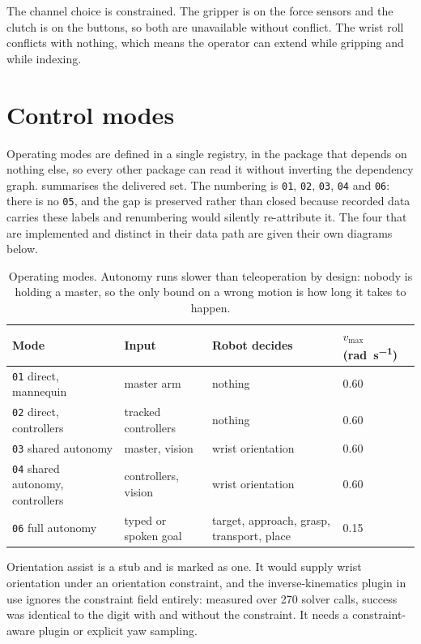 The channel choice is constrained. The gripper is on the force sensors and the
clutch is on the buttons, so both are unavailable without conflict. The wrist
roll conflicts with nothing, which means the operator can extend while
gripping and while indexing.

\section{Control modes}

Operating modes are defined in a single registry, in the package that depends
on nothing else, so every other package can read it without inverting the
dependency graph.  summarises the delivered set. The numbering
is \texttt{01}, \texttt{02}, \texttt{03}, \texttt{04} and \texttt{06}: there is
no \texttt{05}, and the gap is preserved rather than closed because recorded
data carries these labels and renumbering would silently re-attribute it. The
four that are implemented and distinct in their data path are given their own
diagrams below.

\begin{table}[htbp]
  \centering
  \caption{Operating modes. Autonomy runs slower than teleoperation by design:
  nobody is holding a master, so the only bound on a wrong motion is how long
  it takes to happen.}
  \label{tab:modes}
  \begin{tabular}{@{}llll@{}}
    \toprule
    Mode & Input & Robot decides & $v_{\max}$ (\si{\radian\per\second}) \\
    \midrule
    \texttt{01} direct, mannequin & master arm & nothing & 0.60 \\
    \texttt{02} direct, controllers & tracked controllers & nothing & 0.60 \\
    \texttt{03} shared autonomy & master, vision & wrist orientation & 0.60 \\
    \texttt{04} shared autonomy, controllers & controllers, vision
      & wrist orientation & 0.60 \\
    \texttt{06} full autonomy & typed or spoken goal
      & target, approach, grasp, transport, place & 0.15 \\
    \bottomrule
  \end{tabular}
\end{table}

Orientation assist is a stub and is marked as one. It would supply wrist
orientation under an orientation constraint, and the inverse-kinematics plugin
in use ignores the constraint field entirely: measured over 270 solver calls,
success was identical to the digit with and without the constraint. It needs a
constraint-aware plugin or explicit yaw sampling.

